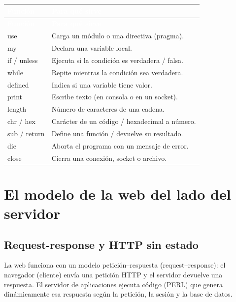 \documentclass[11pt]{article}
\begin{document}
{\renewcommand{\arraystretch}{1.25}
\begin{longtable}{>{\raggedright\arraybackslash}p{2.8cm} >{\raggedright\arraybackslash}p{12.6cm}}
\rowcolor{uteqverde}\textcolor{white}{\textbf{Función}} & \textcolor{white}{\textbf{Para qué sirve}} \\
\endfirsthead
\rowcolor{uteqverde}\textcolor{white}{\textbf{Función}} & \textcolor{white}{\textbf{Para qué sirve}} \\
\endhead
\ttfamily\color{uteqverde}use & Carga un módulo o una directiva (pragma). \\ \hline
\ttfamily\color{uteqverde}my & Declara una variable local. \\ \hline
\ttfamily\color{uteqverde}if / unless & Ejecuta si la condición es verdadera / falsa. \\ \hline
\ttfamily\color{uteqverde}while & Repite mientras la condición sea verdadera. \\ \hline
\ttfamily\color{uteqverde}defined & Indica si una variable tiene valor. \\ \hline
\ttfamily\color{uteqverde}print & Escribe texto (en consola o en un socket). \\ \hline
\ttfamily\color{uteqverde}length & Número de caracteres de una cadena. \\ \hline
\ttfamily\color{uteqverde}chr / hex & Carácter de un código / hexadecimal a número. \\ \hline
\ttfamily\color{uteqverde}sub / return & Define una función / devuelve su resultado. \\ \hline
\ttfamily\color{uteqverde}die & Aborta el programa con un mensaje de error. \\ \hline
\ttfamily\color{uteqverde}close & Cierra una conexión, socket o archivo. \\ \hline
\end{longtable}}
\section{El modelo de la web del lado del servidor}
\subsection{Request-response y HTTP sin estado}
La web funciona con un modelo petición–respuesta (request–response): el navegador (cliente) envía una petición HTTP y el servidor devuelve una respuesta. El servidor de aplicaciones ejecuta código (PERL) que genera dinámicamente esa respuesta según la petición, la sesión y la base de datos.
\end{document}
